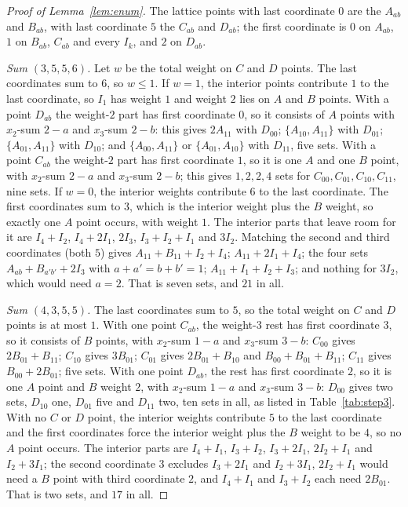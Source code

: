 \documentclass[11pt]{article}
\theoremstyle{definition}
\begin{document}
\begin{appendices}
\begin{proof}[Proof of Lemma~\ref{lem:enum}]
The lattice points with last coordinate $0$ are the $A_{ab}$ and $B_{ab}$,
with last coordinate $5$ the $C_{ab}$ and $D_{ab}$; the first coordinate is
$0$ on $A_{ab}$, $1$ on $B_{ab}$, $C_{ab}$ and every $I_k$, and $2$ on
$D_{ab}$.

\emph{Sum $(3,5,5,6)$.} Let $w$ be the total weight on $C$ and $D$ points.
The last coordinates sum to $6$, so $w\le1$.
If $w=1$, the interior points contribute $1$ to the last coordinate, so
$I_1$ has weight $1$ and weight $2$ lies on $A$ and $B$ points. With a
point $D_{ab}$ the weight-$2$ part has first coordinate $0$, so it consists
of $A$ points with $x_2$-sum $2-a$ and $x_3$-sum $2-b$: this gives
$2A_{11}$ with $D_{00}$; $\{A_{10},A_{11}\}$ with $D_{01}$; $\{A_{01},A_{11}\}$
with $D_{10}$; and $\{A_{00},A_{11}\}$ or $\{A_{01},A_{10}\}$ with $D_{11}$,
five sets. With a point $C_{ab}$ the weight-$2$ part has first coordinate
$1$, so it is one $A$ and one $B$ point, with $x_2$-sum $2-a$ and $x_3$-sum
$2-b$; this gives $1,2,2,4$ sets for $C_{00},C_{01},C_{10},C_{11}$, nine sets.
If $w=0$, the interior weights contribute $6$ to the last coordinate. The
first coordinates sum to $3$, which is the interior weight plus the
$B$ weight, so exactly one $A$ point occurs, with weight $1$. The interior
parts that leave room for it are $I_4+I_2$, $I_4+2I_1$, $2I_3$, $I_3+I_2+I_1$
and $3I_2$. Matching the second and third coordinates (both $5$) gives
$A_{11}+B_{11}+I_2+I_4$; $A_{11}+2I_1+I_4$; the four sets
$A_{ab}+B_{a'b'}+2I_3$ with $a+a'=b+b'=1$; $A_{11}+I_1+I_2+I_3$; and nothing
for $3I_2$, which would need $a=2$. That is seven sets, and $21$ in all.

\emph{Sum $(4,3,5,5)$.} The last coordinates sum to $5$, so the total weight
on $C$ and $D$ points is at most $1$. With one point $C_{ab}$, the weight-$3$
rest has first coordinate $3$, so it consists of $B$ points, with $x_2$-sum
$1-a$ and $x_3$-sum $3-b$: $C_{00}$ gives $2B_{01}+B_{11}$; $C_{10}$ gives
$3B_{01}$; $C_{01}$ gives $2B_{01}+B_{10}$ and $B_{00}+B_{01}+B_{11}$; $C_{11}$
gives $B_{00}+2B_{01}$; five sets. With one point $D_{ab}$, the rest has
first coordinate $2$, so it is one $A$ point and $B$ weight $2$, with
$x_2$-sum $1-a$ and $x_3$-sum $3-b$: $D_{00}$ gives two sets, $D_{10}$ one,
$D_{01}$ five and $D_{11}$ two, ten sets in all, as listed in
Table~\ref{tab:step3}. With no $C$ or $D$ point, the interior weights
contribute $5$ to the last coordinate and the first coordinates force the
interior weight plus the $B$ weight to be $4$, so no $A$ point occurs. The
interior parts are $I_4+I_1$, $I_3+I_2$, $I_3+2I_1$, $2I_2+I_1$ and
$I_2+3I_1$; the second coordinate $3$ excludes $I_3+2I_1$ and $I_2+3I_1$,
$2I_2+I_1$ would need a $B$ point with third coordinate $2$, and $I_4+I_1$
and $I_3+I_2$ each need $2B_{01}$. That is two sets, and $17$ in all.
\end{proof}


\end{appendices}
\end{document}
